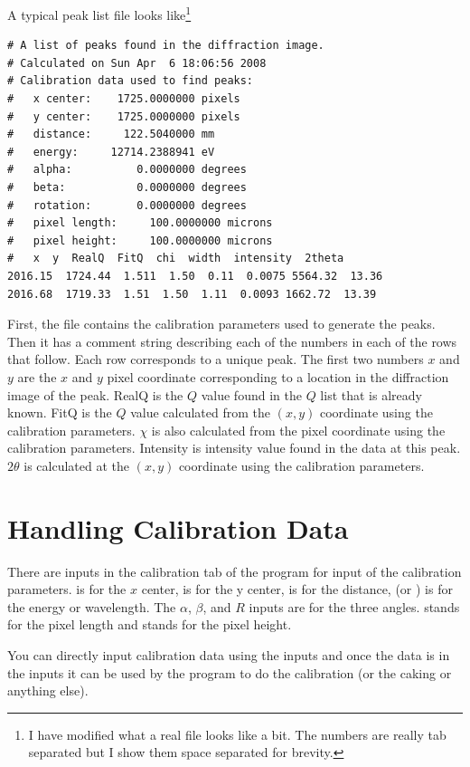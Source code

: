 A typical peak list file looks like\footnote{I have modified
what a real file looks like a bit. The numbers are really tab 
separated but I show them space separated for brevity.}
\begin{lstlisting}[caption={A Peak List File,basicstyle=\ttfamily\tiny}]
# A list of peaks found in the diffraction image.
# Calculated on Sun Apr  6 18:06:56 2008
# Calibration data used to find peaks:
#   x center:    1725.0000000 pixels
#   y center:    1725.0000000 pixels
#   distance:     122.5040000 mm
#   energy:     12714.2388941 eV
#   alpha:          0.0000000 degrees
#   beta:           0.0000000 degrees
#   rotation:       0.0000000 degrees
#   pixel length:     100.0000000 microns
#   pixel height:     100.0000000 microns
#   x  y  RealQ  FitQ  chi  width  intensity  2theta
2016.15  1724.44  1.511  1.50  0.11  0.0075 5564.32  13.36
2016.68  1719.33  1.51  1.50  1.11  0.0093 1662.72  13.39
\end{lstlisting}
First, the file contains the calibration parameters
used to generate the peaks. Then it has a comment string
describing each of the numbers in each of the rows
that follow. Each row corresponds to a unique peak.
The first two numbers $x$ and $y$ are
the $x$ and $y$ pixel coordinate corresponding to
a location in the diffraction image of the peak. RealQ 
is the $Q$ value found in the $Q$ list that is already 
known. FitQ is the $Q$ value calculated 
from the $(x,y)$ coordinate using the calibration
parameters. $\chi$ is also calculated from the pixel
coordinate using the calibration parameters. 
Intensity is intensity value found in the data at
this peak. $2\theta$ is calculated at the $(x,y)$ 
coordinate using the calibration parameters.

\section{Handling Calibration Data}

There are inputs in the calibration tab of the
program for input of the calibration parameters.
 is for the $x$ center,  is
for the y center,  is for the distance,
 (or \gui{$\lambda$:}) is for the energy
or wavelength. The $\alpha$, $\beta$, and
$R$ inputs are for the three angles. 
 stands for the pixel length
and  stands for the pixel height.

You can directly input calibration data using 
the inputs and once the data is in the inputs
it can be used by the program to do the calibration
(or the caking or anything else).

